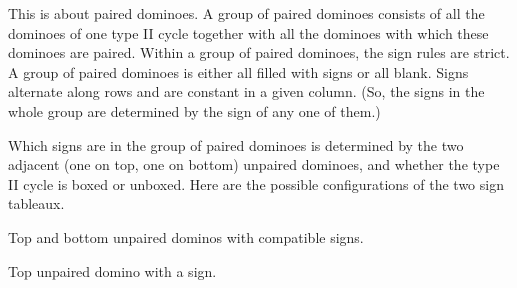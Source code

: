 \documentclass[12pt]{article}
\numberwithin{equation}{section}
\theoremstyle{definition}
\theoremstyle{remark}
\begin{document}
  This is about paired dominoes.
  A group of paired dominoes consists of all the dominoes of one type II cycle together with all the dominoes with which these dominoes are paired.
  Within a group of paired dominoes, the sign rules are strict.
  A group of paired dominoes is either all filled with signs or all blank.
  Signs alternate along rows and are constant in a given column.
  (So, the signs in the whole group are determined by the sign of any one of them.)

  Which signs are in the group of paired dominoes is determined by the two adjacent (one on top, one on bottom) unpaired dominoes, and whether the type II cycle is boxed or unboxed.
  Here are the possible configurations of the two sign tableaux.

  Top and bottom unpaired dominos with compatible signs.
  \begin{figure}[H]
    \centering
  \end{figure}

  \begin{figure}[H]
    \centering
  \end{figure}

  Top unpaired domino with a sign.

  \begin{figure}[H]
    \centering
  \end{figure}
\end{document}
